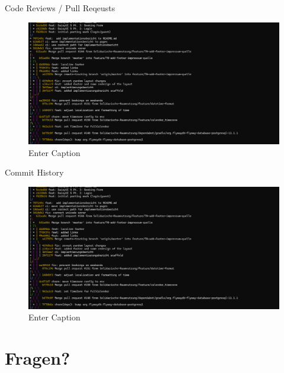 \documentclass{sdqbeamer}
\begin{document}
\begin{frame}{Code Reviews / Pull Reqeusts}
\begin{figure}
    \centering
    \includegraphics[width=1\linewidth]{image.png}
    \caption{Enter Caption}
    \label{fig:enter-label}
\end{figure}
\end{frame}

\begin{frame}{Commit History}
    \begin{figure}
        \centering
        \includegraphics[width=1\linewidth]{image.png}
        \caption{Enter Caption}
        \label{fig:enter-label}
    \end{figure}
\end{frame}


\section{Fragen?}
\end{document}
